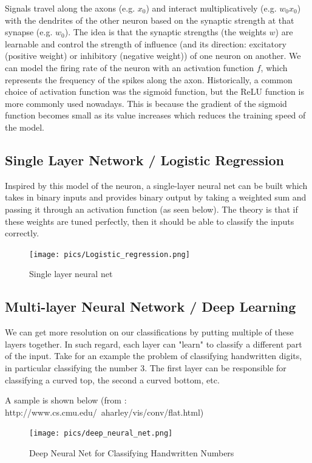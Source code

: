 \documentclass[twoside]{article}
\begin{document}
Signals travel along the axons (e.g. $x_0$) and interact multiplicatively (e.g. $w_{0}x_{0}$) with the dendrites of the other neuron based on the synaptic strength at that synapse (e.g. $w_0$). The idea is that the synaptic strengths (the weights $w$) are learnable and control the strength of influence (and its direction: excitatory (positive weight) or inhibitory (negative weight)) of one neuron on another. We can model the firing rate of the neuron with an activation function $f$, which represents the frequency of the spikes along the axon. Historically, a common choice of activation function was the sigmoid function, but the ReLU function is more commonly used nowadays. This is because the gradient of the sigmoid function becomes small as its value increases which reduces the training speed of the model.


\subsection{Single Layer Network / Logistic Regression}
Inspired by this model of the neuron, a single-layer neural net can be built which takes in binary inputs and provides binary output by taking a weighted sum and passing it through an activation function (as seen below). The theory is that if these weights are tuned perfectly, then it should be able to classify the inputs correctly.


\begin{figure}[!htb]
\centering
\texttt{[image: pics/Logistic\_regression.png]}
\caption{Single layer neural net\cite{Lecture slides}}
\label{fig:Single layer neural net}
\end{figure}


\subsection{Multi-layer Neural Network / Deep Learning}

We can get more resolution on our classifications by putting multiple of these layers together. In such regard, each layer can "learn" to classify a different part of the input. Take for an example the problem of classifying handwritten digits, in particular classifying the number 3. The first layer can be responsible for classifying a curved top, the second a curved bottom, etc.

A sample is shown below (from : http://www.cs.cmu.edu/~aharley/vis/conv/flat.html)

\begin{figure}[!htb]
\centering
\texttt{[image: pics/deep\_neural\_net.png]}
\caption{Deep Neural Net for Classifying Handwritten Numbers\cite{}}
\label{fig:Single layer neural net}
\end{figure}
\end{document}

